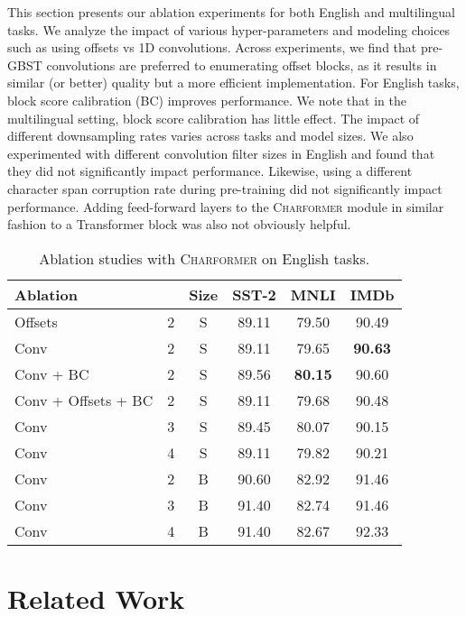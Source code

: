 \documentclass{article} \usepackage{iclr2022_conference,times}
\newcommand{\charformer}{\textsc{Charformer}\xspace}
\newcommand{\charformersmall}{\textsc{Charformer}\xspace}
\begin{document}
\label{sec:ablations}
This section presents our ablation experiments for both English and multilingual tasks. We analyze the impact of various hyper-parameters and modeling choices such as using offsets vs 1D convolutions. Across experiments, we find that pre-GBST convolutions are preferred to enumerating offset blocks, as it results in similar (or better) quality but a more efficient implementation. For English tasks, block score calibration (BC) improves performance. We note that in the multilingual setting, block score calibration has little effect. The impact of different downsampling rates varies across tasks and model sizes. We also experimented with different convolution filter sizes in English and found that they did not significantly impact performance. Likewise, using a different character span corruption rate during pre-training did not significantly impact performance. Adding feed-forward layers to the \charformer module in similar fashion to a Transformer block was also not obviously helpful.

\begin{table}[H]
\small
    \centering
    \caption{Ablation studies with \charformersmall on English tasks.}
    \begin{tabular}{l|c|c|ccc}
    \toprule
     Ablation    &  &Size &   SST-2 & MNLI & IMDb\\
     \midrule
     Offsets & 2 & S & 89.11 & 79.50 & 90.49 \\
     Conv  & 2 & S & 89.11 & 79.65 &  \textbf{90.63}\\ 
     Conv + BC & 2 & S &89.56 & \textbf{80.15} & 90.60\\
Conv + Offsets + BC &2 & S &  89.11 & 79.68 &90.48 \\
\midrule
      Conv & 3 & S &89.45 & 80.07  & 90.15\\
Conv & 4 & S & 89.11 & 79.82 &90.21 \\
      \midrule
      Conv & 2 & B & 90.60 & 82.92 & 91.46 \\ 
      Conv & 3 & B & 91.40 & 82.74 & 91.46\\
      Conv & 4 & B & 91.40 & 82.67 & 92.33\\
      \bottomrule
    \end{tabular}
    \label{tab:my_label}
\end{table}




\section{Related Work} \label{sec:related_work}
\end{document}
